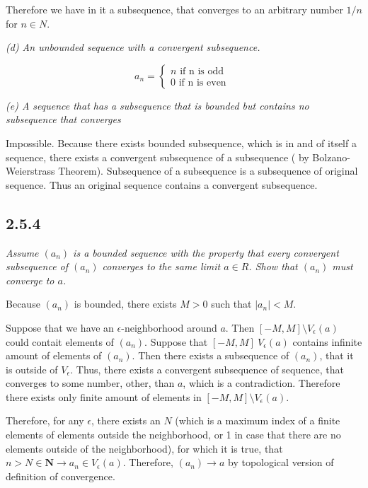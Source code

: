 \documentclass[11pt,oneside,titlepage]{book}
\begin{document}
Therefore we have in it a subsequence, that converges to an arbitrary number
$1/n$ for $n \in N$.

\textit{(d) An unbounded sequence with a convergent subsequence.}

\begin{equation}
  a_n =
  \begin{cases}
    n \text{ if n is odd } \\
    0 \text{ if n is even }
  \end{cases}
\end{equation}

\textit{(e) A sequence that has a subsequence that is bounded but contains no
  subsequence that converges}

Impossible. Because there exists bounded subsequence, which is in and of itself
a sequence, there exists a convergent subsequence of a subsequence ( by
Bolzano-Weierstrass Theorem). Subsequence of a subsequence is a subsequence of
original sequence. Thus an original sequence contains a convergent
subsequence.

\subsection*{2.5.4}
\textit{Assume $(a_n)$ is a bounded sequence with the property that every
  convergent subsequence of $(a_n)$ converges to the same limit $a \in R$.
  Show that $(a_n)$ must converge to $a$.}


Because $(a_n)$ is bounded, there exists $M > 0$ such that
$|a_n| < M$.

Suppose that we have an $\epsilon$-neighborhood around $a$. Then
$[-M, M] \setminus V_{\epsilon}(a)$ could contait elements of $(a_n)$.
Suppose that $[-M, M] \ V_{\epsilon}(a)$ contains infinite amount of elements
of $(a_n)$. Then there exists a subsequence of $(a_n)$, that
it is outside of  $V_{\epsilon}$. Thus, there exists a convergent subsequence
of sequence, that converges to some number, other, than $a$, which is a
contradiction. Therefore there exists only finite amount of elements in
$[-M, M] \setminus V_{\epsilon}(a)$.

Therefore, for any $\epsilon$, there exists an $N$ (which is
a maximum index of a finite elements of elements outside the neighborhood, or
1 in case that there are no elements outside of the neighborhood),
for which it is true, that $n > N \in \textbf{N} \to a_n \in V_{\epsilon}(a)$.
Therefore, $(a_n) \to a$ by topological version of definition of convergence.
\end{document}
